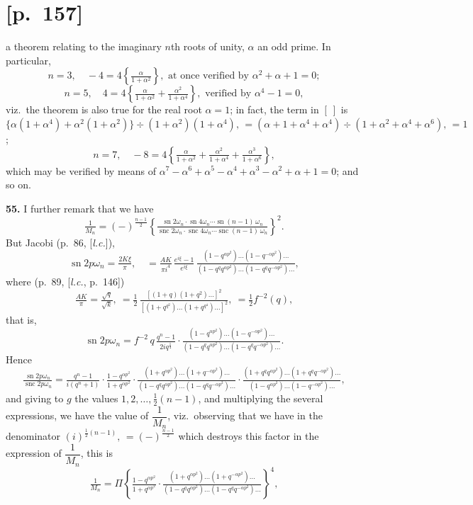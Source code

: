 \documentclass[11pt]{article}
\begin{document}
\section*{[p.~157]}
a theorem relating to the imaginary $n$th roots of unity, $\alpha$ an odd prime. In particular,
\[
n=3,\quad -4=4\!\left\{\tfrac{\alpha}{1+\alpha^2}\right\}\!,\text{ at once verified by }\alpha^2+\alpha+1=0;
\]
\[
n=5,\quad 4=4\!\left\{\tfrac{\alpha}{1+\alpha^2}+\tfrac{\alpha^2}{1+\alpha^4}\right\}\!,\text{ verified by }\alpha^4-1=0,
\]
viz.\ the theorem is also true for the real root $\alpha=1$; in fact, the term in $[\ ]$ is
$\{\alpha(1+\alpha^4)+\alpha^2(1+\alpha^2)\}\div(1+\alpha^2)(1+\alpha^4),\,=(\alpha+1+\alpha^4+\alpha^4)\div(1+\alpha^2+\alpha^4+\alpha^6),\,=1$;
\[
n=7,\quad -8=4\!\left\{\tfrac{\alpha}{1+\alpha^2}+\tfrac{\alpha^2}{1+\alpha^4}+\tfrac{\alpha^3}{1+\alpha^6}\right\}\!,
\]
which may be verified by means of $\alpha^7-\alpha^6+\alpha^5-\alpha^4+\alpha^3-\alpha^2+\alpha+1=0$; and so on.

\medskip
\noindent\textbf{55.} I further remark that we have
\[
\tfrac{1}{M_n}=(-)^{\frac{n-1}{2}}\!\left\{\tfrac{\operatorname{sn}2\omega_n\cdot\operatorname{sn}4\omega_n\cdots\operatorname{sn}(n-1)\,\omega_n}{\operatorname{snc}2\omega_n\cdot\operatorname{snc}4\omega_n\cdots\operatorname{snc}(n-1)\,\omega_n}\right\}^{\!2}\!.
\]
But Jacobi (p.~86, [\textit{l.c.}]),
\[
\operatorname{sn}2p\omega_n=\tfrac{2K\xi}{\pi},\quad=\tfrac{AK}{\pi i^4}\,\tfrac{e^{i\xi}-1}{e^{i\xi}}\,\tfrac{(1-q^{\alpha p^2})\ldots(1-q^{-\alpha p^2})\ldots}{(1-q^{q}q^{\alpha p^2})\ldots(1-q^{q}q^{-\alpha p^2})\ldots},
\]
where (p.~89, [\textit{l.c.}, p.~146])
\[
\tfrac{AK}{\pi}=\tfrac{\sqrt{q}}{\sqrt{k}}\!,\ =\tfrac{1}{2}\,\tfrac{[(1+q)(1+q^2)\ldots]^2}{[(1+q^{q^2})\ldots(1+q^{q^4})\ldots]^2}\!,\ =\tfrac{1}{2}f^{-2}(q),
\]
that is,
\[
\operatorname{sn}2p\omega_n=f^{-2}\,q\,\tfrac{q^n-1}{2iq^{\frac{1}{4}}}\!\cdot\!\tfrac{(1-q^{\alpha p^2})\ldots(1-q^{-\alpha p^2})\ldots}{(1-q^{q}q^{\alpha p^2})\ldots(1-q^{q}q^{-\alpha p^2})\ldots}.
\]
Hence
\[
\tfrac{\operatorname{sn}2p\omega_n}{\operatorname{snc}2p\omega_n}=\tfrac{q^n-1}{i(q^n+1)}\!\cdot\!\tfrac{1-q^{\alpha p^2}}{1+q^{\alpha p^2}}\!\cdot\!\tfrac{(1+q^{\alpha p^2})\ldots(1+q^{-\alpha p^2})\ldots}{(1-q^{q}q^{\alpha p^2})\ldots(1-q^{q}q^{-\alpha p^2})\ldots}\!\cdot\!\tfrac{(1+q^{q}q^{\alpha p^2})\ldots(1+q^{q}q^{-\alpha p^2})\ldots}{(1-q^{\alpha p^2})\ldots(1-q^{-\alpha p^2})\ldots},
\]
and giving to $g$ the values $1, 2, \ldots, \tfrac{1}{2}(n-1)$, and multiplying the several expressions,
we have the value of $\dfrac{1}{M_n}$, viz.\ observing that we have in the denominator
$(i)^{\frac{1}{2}(n-1)},\,=(-)^{\frac{n-1}{2}}$ which destroys this factor in the expression of $\dfrac{1}{M_n}$, this is
\[
\tfrac{1}{M_n}=\Pi\!\left\{\tfrac{1-q^{\alpha p^2}}{1+q^{\alpha p^2}}\!\cdot\!\tfrac{(1+q^{\alpha p^2})\ldots(1+q^{-\alpha p^2})\ldots}{(1-q^{q}q^{\alpha p^2})\ldots(1-q^{q}q^{-\alpha p^2})\ldots}\right\}^{\!4}\!,
\]
\end{document}
